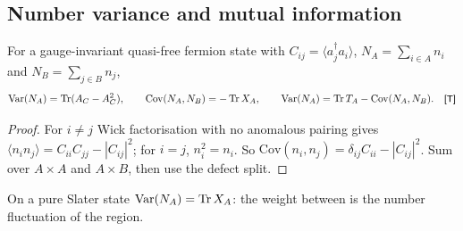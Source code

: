 \subsection{Number variance and mutual information}\label{sec:info}
\begin{proposition}\label{prop:variance}
For a gauge-invariant quasi-free fermion state with $C_{ij}=\langle a_j^\dagger a_i\rangle$, $N_A=\sum_{i\in A}n_i$ and $N_B=\sum_{j\in B}n_j$,
\[
\mathrm{Var}(N_A)=\operatorname{Tr}(A_C-A_C^2),\qquad\mathrm{Cov}(N_A,N_B)=-\operatorname{Tr} X_A,\qquad\mathrm{Var}(N_A)=\operatorname{Tr} T_A-\mathrm{Cov}(N_A,N_B). \quad\textsf{\small[T]}
\]
\end{proposition}
\begin{proof}
For $i\neq j$ Wick factorisation with no anomalous pairing gives $\langle n_in_j\rangle=C_{ii}C_{jj}-|C_{ij}|^2$; for $i=j$, $n_i^2=n_i$. So $\mathrm{Cov}(n_i,n_j)=\delta_{ij}C_{ii}-|C_{ij}|^2$. Sum over $A\times A$ and $A\times B$, then use the defect split.
\end{proof}
On a pure Slater state $\mathrm{Var}(N_A)=\operatorname{Tr} X_A$: the weight between is the number fluctuation of the region.

